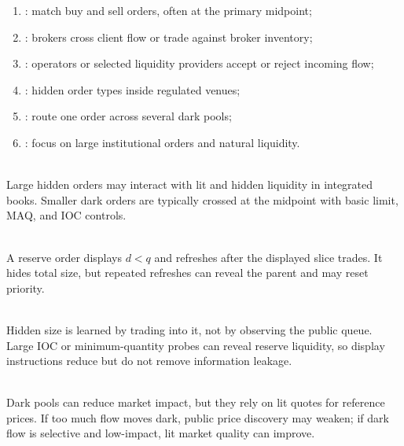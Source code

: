 \begin{taxonomy} 
\begin{enumerate}[label=\roman*.]
\setlength{\itemsep}{0pt}
\item {}: match buy and sell orders, often at the primary midpoint;
\item {}: brokers cross client flow or trade against broker inventory;
\item {}: operators or selected liquidity providers accept or reject incoming flow;
\item {}: hidden order types inside regulated venues;
\item {}: route one order across several dark pools;
\item {}: focus on large institutional orders and natural liquidity.
\end{enumerate}
\end{taxonomy}

\begin{mechanism} \\
Large hidden orders may interact with lit and hidden liquidity in integrated books. Smaller dark orders are typically crossed at the midpoint with basic limit, MAQ, and IOC controls.
\end{mechanism}

\begin{mechanism} \\
A reserve order displays $d<q$ and refreshes after the displayed slice trades. It hides total size, but repeated refreshes can reveal the parent and may reset priority.
\end{mechanism}

\begin{caveat} \\
Hidden size is learned by trading into it, not by observing the public queue. Large IOC or minimum-quantity probes can reveal reserve liquidity, so display instructions reduce but do not remove information leakage.
\end{caveat}

\begin{caveat} \\
Dark pools can reduce market impact, but they rely on lit quotes for reference prices. If too much flow moves dark, public price discovery may weaken; if dark flow is selective and low-impact, lit market quality can improve.
\end{caveat}

